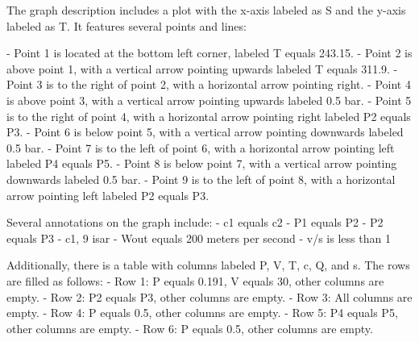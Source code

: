 The graph description includes a plot with the x-axis labeled as S and the y-axis labeled as T. It features several points and lines:

- Point 1 is located at the bottom left corner, labeled T equals 243.15.
- Point 2 is above point 1, with a vertical arrow pointing upwards labeled T equals 311.9.
- Point 3 is to the right of point 2, with a horizontal arrow pointing right.
- Point 4 is above point 3, with a vertical arrow pointing upwards labeled 0.5 bar.
- Point 5 is to the right of point 4, with a horizontal arrow pointing right labeled P2 equals P3.
- Point 6 is below point 5, with a vertical arrow pointing downwards labeled 0.5 bar.
- Point 7 is to the left of point 6, with a horizontal arrow pointing left labeled P4 equals P5.
- Point 8 is below point 7, with a vertical arrow pointing downwards labeled 0.5 bar.
- Point 9 is to the left of point 8, with a horizontal arrow pointing left labeled P2 equals P3.

Several annotations on the graph include:
- c1 equals c2
- P1 equals P2
- P2 equals P3
- c1, 9 isar
- Wout equals 200 meters per second
- v/s is less than 1

Additionally, there is a table with columns labeled P, V, T, c, Q, and s. The rows are filled as follows:
- Row 1: P equals 0.191, V equals 30, other columns are empty.
- Row 2: P2 equals P3, other columns are empty.
- Row 3: All columns are empty.
- Row 4: P equals 0.5, other columns are empty.
- Row 5: P4 equals P5, other columns are empty.
- Row 6: P equals 0.5, other columns are empty.